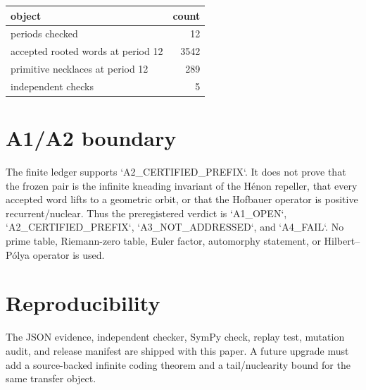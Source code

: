 \documentclass[10pt]{article}
\begin{document}
\begin{center}
\begin{tabular}{lr}
\toprule
object & count\\
\midrule
periods checked & 12\\
accepted rooted words at period 12 & 3542\\
primitive necklaces at period 12 & 289\\
independent checks & 5\\
\bottomrule
\end{tabular}
\end{center}

\section{A1/A2 boundary}
The finite ledger supports `A2\_CERTIFIED\_PREFIX`.  It does not prove that
the frozen pair is the infinite kneading invariant of the H\'enon repeller,
that every accepted word lifts to a geometric orbit, or that the Hofbauer
operator is positive recurrent/nuclear.  Thus the preregistered verdict is
`A1\_OPEN`, `A2\_CERTIFIED\_PREFIX`, `A3\_NOT\_ADDRESSED`, and `A4\_FAIL`.
No prime table, Riemann-zero table, Euler factor, automorphy statement, or
Hilbert--P\'olya operator is used.

\section{Reproducibility}
The JSON evidence, independent checker, SymPy check, replay test, mutation
audit, and release manifest are shipped with this paper.  A future upgrade
must add a source-backed infinite coding theorem and a tail/nuclearity bound
for the same transfer object.
\end{document}
